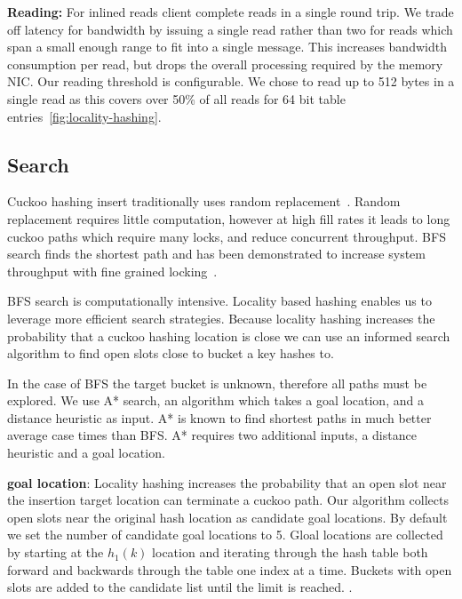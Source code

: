 \textbf{Reading:} For inlined reads client complete reads in
a single round trip. We trade off latency for bandwidth by
issuing a single read rather than two for reads which span a
small enough range to fit into a single message. This
increases bandwidth consumption per read, but drops the
overall processing required by the memory NIC. Our reading
threshold is configurable. We chose to read up to 512 bytes
in a single read as this covers over 50\% of all reads for
64 bit table entries~\ref{fig:locality-hashing}.

\subsection{Search}
Cuckoo hashing insert traditionally uses random
replacement~\cite{cuckoo}. Random replacement requires
little computation, however at high fill rates it leads to
long cuckoo paths which require many locks, and reduce
concurrent throughput. BFS search finds the shortest path
and has been demonstrated to increase system throughput with
fine grained locking~\cite{algorithmic-improvements}.

BFS search is computationally intensive. Locality based
hashing enables us to leverage more efficient search
strategies. Because locality hashing increases the
probability that a cuckoo hashing location is close we can
use an informed search algorithm to find open slots close to
bucket a key hashes to. 

In the case of BFS the target bucket is unknown, therefore
all paths must be explored. We use A* search, an algorithm
which takes a goal location, and a distance heuristic as
input. A* is known to find shortest paths in much better
average case times than BFS. A* requires two additional
inputs, a distance heuristic and a goal location.

\textbf{goal location}: Locality hashing increases the
probability that an open slot near the insertion target
location can terminate a cuckoo path. Our algorithm collects
open slots near the original hash location as candidate goal
locations. By default we set the number of candidate goal
locations to 5. Gloal locations are collected by starting at
the $h_1(k)$ location and iterating through the hash
table both forward and backwards through the table one index
at a time. Buckets with open slots are added to the
candidate list until the limit is reached. .

